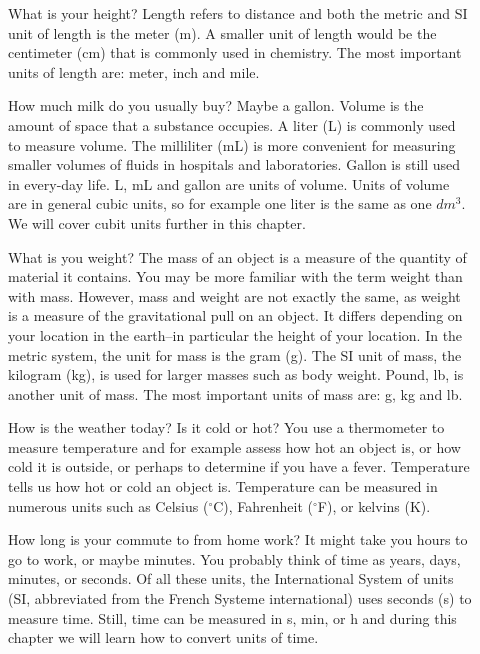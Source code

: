 \documentclass[main.tex]{subfiles}
\begin{document}
\sloppy
\begin{description}
\item[] What is your height? Length refers to distance and  both the metric and SI unit of length is the meter (m). A smaller unit of length would be the centimeter (cm) that is  commonly used in chemistry. The most important units of length are: meter, inch and mile.
  
\item[] How much milk do you usually buy? Maybe a gallon. Volume is the amount of space that a substance occupies. A liter (L) is commonly used to measure volume. The milliliter (mL) is more convenient for measuring smaller volumes of fluids in hospitals and laboratories. Gallon is still used in every-day life.  L, mL and gallon are units of volume. Units of volume are in general cubic units, so for example one liter is the same as one $dm^3$. We will cover cubit units further in this chapter.

\item[]What is you weight? The mass of an object is a measure of the quantity of material it contains. You may be more familiar with the term weight than with mass. However, mass and weight are not exactly the same, as  weight is a measure of the gravitational pull on an object. It differs depending on your location in the earth--in particular the height of your location. In the metric system, the unit for mass is the gram (g). The SI unit of mass, the kilogram (kg), is used for larger masses such as body weight. Pound, lb, is another unit of mass. The most important units of mass are: g, kg and lb.

\item[] How is the weather today? Is it cold or hot? You use a thermometer to measure temperature and for example assess how hot an object is, or how cold it is outside, or perhaps to determine if you have a fever.  Temperature tells us how hot or cold an object is. Temperature can be measured in numerous units such as Celsius ($^{\circ}$C), Fahrenheit ($^{\circ}$F), or kelvins (K). 

\item[]How long is your commute to from home work? It might take you hours to go to work, or maybe minutes. You probably think of time as years, days, minutes, or seconds. Of all these units, the International System of units (SI, abbreviated from the French Systeme international) uses seconds (s) to measure time. Still, time can be measured in s, min, or h and during this chapter we will learn how to convert units of time.

\end{description}
 
\end{document}
